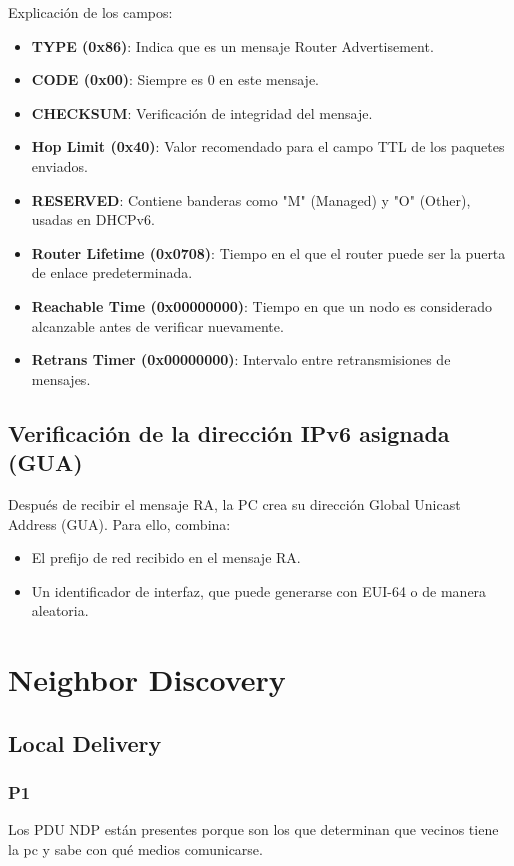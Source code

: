 \documentclass[]{article}
\begin{document}
	Explicación de los campos:
	
	\begin{itemize}
		\item \textbf{TYPE (0x86)}: Indica que es un mensaje Router Advertisement.
		\item \textbf{CODE (0x00)}: Siempre es 0 en este mensaje.
		\item \textbf{CHECKSUM}: Verificación de integridad del mensaje.
		\item \textbf{Hop Limit (0x40)}: Valor recomendado para el campo TTL de los paquetes enviados.
		\item \textbf{RESERVED}: Contiene banderas como "M" (Managed) y "O" (Other), usadas en DHCPv6.
		\item \textbf{Router Lifetime (0x0708)}: Tiempo en el que el router puede ser la puerta de enlace predeterminada.
		\item \textbf{Reachable Time (0x00000000)}: Tiempo en que un nodo es considerado alcanzable antes de verificar nuevamente.
		\item \textbf{Retrans Timer (0x00000000)}: Intervalo entre retransmisiones de mensajes.
	\end{itemize}
	
	\subsection{\textbf{Verificación de la dirección IPv6 asignada (GUA)}}
	
	Después de recibir el mensaje RA, la PC crea su dirección Global Unicast Address (GUA).  
	Para ello, combina:
	
	\begin{itemize}
		\item El prefijo de red recibido en el mensaje RA.
		\item Un identificador de interfaz, que puede generarse con EUI-64 o de manera aleatoria.
	\end{itemize}
	
	\section{\textbf{Neighbor Discovery}}
	
	\subsection{\textbf{Local Delivery}}
	
	\subsubsection{\textbf{P1}}
	Los PDU NDP están presentes porque son los que determinan que vecinos tiene la pc y sabe con qué medios comunicarse.
\end{document}

